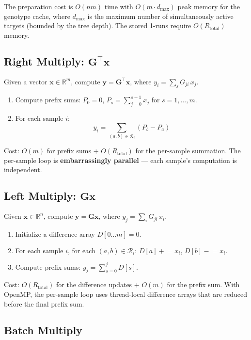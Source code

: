 \documentclass[11pt]{article}
\begin{document}
The preparation cost is $O(nm)$ time with $O(m \cdot d_\text{max})$ peak
memory for the genotype cache, where $d_\text{max}$ is the maximum number
of simultaneously active targets (bounded by the tree depth).  The stored
1-runs require $O(R_\text{total})$ memory.

\subsection{Right Multiply: $\mathbf{G}^\top \mathbf{x}$}

Given a vector $\mathbf{x} \in \mathbb{R}^m$, compute $\mathbf{y} =
\mathbf{G}^\top \mathbf{x}$, where $y_i = \sum_j G_{ji} \, x_j$.

\begin{enumerate}
\item Compute prefix sums: $P_0 = 0$, $P_s = \sum_{j=0}^{s-1} x_j$ for
$s = 1, \ldots, m$.
\item For each sample $i$:
\[
y_i = \sum_{(a,b) \in \mathcal{R}_i} (P_b - P_a)
\]
\end{enumerate}

Cost: $O(m)$ for prefix sums $+$ $O(R_\text{total})$ for the per-sample
summation.  The per-sample loop is \textbf{embarrassingly parallel} ---
each sample's computation is independent.

\subsection{Left Multiply: $\mathbf{G} \mathbf{x}$}

Given $\mathbf{x} \in \mathbb{R}^n$, compute $\mathbf{y} = \mathbf{G}
\mathbf{x}$, where $y_j = \sum_i G_{ji} \, x_i$.

\begin{enumerate}
\item Initialize a difference array $D[0 \ldots m] = 0$.
\item For each sample $i$, for each $(a,b) \in \mathcal{R}_i$:
$D[a] \mathrel{+}= x_i$, \; $D[b] \mathrel{-}= x_i$.
\item Compute prefix sums: $y_j = \sum_{s=0}^{j} D[s]$.
\end{enumerate}

Cost: $O(R_\text{total})$ for the difference updates $+$ $O(m)$ for the
prefix sum.  With OpenMP, the per-sample loop uses thread-local difference
arrays that are reduced before the final prefix sum.

\subsection{Batch Multiply}
\end{document}

